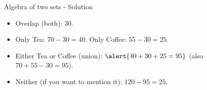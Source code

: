 \documentclass[9pt]{beamer}
\begin{document}
\begin{frame}{Algebra of two sets - Solution}
    
    \begin{center}
    \end{center}
    \vspace{0.2cm}
    
    \small
    \begin{itemize}[leftmargin = 0.5cm, label = $\bullet$, rightmargin = 0.2cm]
      \item Overlap (both): \(30\).
      \item Only Tea: \(70-30=40\). \quad Only Coffee: \(55-30=25\).
      \item Either Tea or Coffee (union): \(\alert{40+30+25=95}\) \; (also \(70+55-30=95\)).
      \item Neither (if you want to mention it): \(120-95=25\).
    \end{itemize}    
\end{frame}



\end{document}
